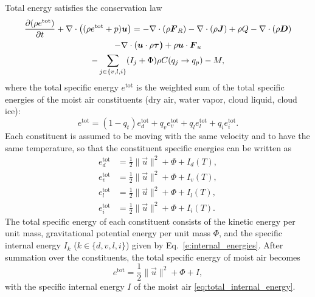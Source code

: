 \documentclass{report}
\begin{document}
Total energy satisfies the conservation law \citep{Romps08a,Bott08a} 
\begin{multline}
 \frac{\partial (\rho e^\mathrm{tot})}{\partial t} + \nabla \cdot \left( (\rho e^\mathrm{tot} + p)\boldsymbol{{u}} \right)
 = -\nabla \cdot (\rho \boldsymbol{{F}}_R) - \nabla \cdot (\rho \boldsymbol{{J}}) + \rho Q - \nabla \cdot (\rho \boldsymbol{{D}})  \\
  - \nabla \cdot (\boldsymbol{{u}} \cdot \rho\boldsymbol{{\tau)}} + \rho \boldsymbol{{u}} \cdot \boldsymbol{{F}}_u \\
   - \sum_{j\in\{v,l,i\}}(I_j + \Phi)  \rho C(q_j \rightarrow q_p) - M,
 \label{eq:energy_balance}
\end{multline}
where the total specific energy $e^{\mathrm{tot}}$ is the weighted sum of the total specific energies of the moist air constituents (dry air, water vapor, cloud liquid, cloud ice):
\begin{equation}\label{e:energy_sum}
    e^{\mathrm{tot}} = (1-q_t) e_d^{\mathrm{tot}} + q_v e_v^{\mathrm{tot}} + q_l e_l^{\mathrm{tot}} + q_i e_i^{\mathrm{tot}}.
\end{equation}
Each constituent is assumed to be moving with the same velocity and to have the same temperature, so that the constituent specific energies can be written as
\begin{subequations}\label{e:constituent_energies}
\begin{align}
e_d^{\mathrm{tot}} & = \frac{1}{2} \| \vec{u} \|^2 + \Phi + I_d(T), \\
e_v^{\mathrm{tot}} & = \frac{1}{2} \| \vec{u} \|^2 + \Phi + I_v(T), \\
e_l^{\mathrm{tot}} & = \frac{1}{2} \| \vec{u} \|^2 + \Phi + I_l(T), \\
e_i^{\mathrm{tot}} & = \frac{1}{2} \| \vec{u} \|^2 + \Phi + I_i(T).
\end{align}
\end{subequations}
The total specific energy of each constituent consists of the kinetic energy per unit mass, gravitational potential energy per unit mass $\Phi$, and the specific internal energy $I_k$ ($k \in \{d, v, l, i\}$) given by Eq.~\eqref{e:internal_energies}. After summation over the constituents, the total specific energy of moist air becomes
\begin{equation}
     e^{\mathrm{tot}} = \frac{1}{2} \| \vec{u} \|^2 + \Phi + I,
     \label{eq:total_energy_def}
\end{equation}
with the specific internal energy $I$ of the moist air \eqref{eq:total_internal_energy}.
\end{document}

